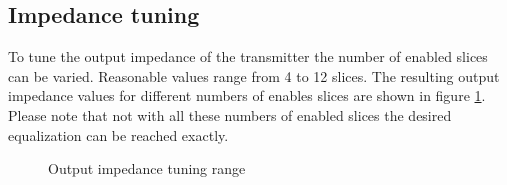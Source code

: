 \subsection{Impedance tuning}

To tune the output impedance of the transmitter the number of enabled slices can be varied. Reasonable values range from 4 to 12 slices. The resulting output impedance values for different numbers of enables slices are shown in figure \ref{fig:imp_tuning}. Please note that not with all these numbers of enabled slices the desired equalization can be reached exactly.



\begin{figure}[H]
  \centering
  \caption{Output impedance tuning range}
  \label{fig:imp_tuning}
\end{figure}

